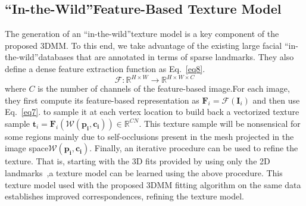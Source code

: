 \documentclass[twocolumn]{article}
\begin{document}
        \subsection{``In-the-Wild''Feature-Based Texture Model}
        The generation of an ``in-the-wild''texture model is a key component of the proposed 3DMM. To this end, we take advantage of the existing large facial ``in-the-wild''databases that are annotated in terms of sparse landmarks. They also define a dense feature extraction function as Eq.~\ref{eq8}.
        \begin{equation}
        \mathcal{F}: \mathbb{R}^{H \times W} \to \mathbb{R}^{H \times W \times C}
        \label{eq8}
        \end{equation}
        where $C$ is the number of channels of the feature-based image.For each image, they first compute its feature-based
        representation as $\mathbf{F}_i = \mathcal{F}(\mathbf{I}_i)$ and then use Eq.~\ref{eq7}. to sample
        it at each vertex location to build back a vectorized texture sample
        $ \mathbf{t}_i = \mathbf{F}_i \left(\mathcal{W}(\mathbf{p_i, c_i})\right) \in \mathbb{R}^{CN}$. This texture sample
        will be nonsensical for some regions mainly due to self-occlusions present in the mesh projected in the image 
        space$\mathcal{W}(\mathbf{p_i, c_i}).$ Finally, an iterative procedure can be used to refine the texture. That is,
        starting with the 3D fits provided by using only the 2D landmarks~\cite{[20]},a texture model can be learned using 
        the above procedure. This texture model used with the proposed 3DMM fitting algorithm on the same data 
        establishes improved correspondences, refining the texture model.
        
\clearpage


\end{document}

